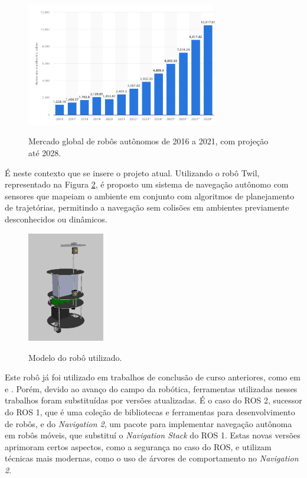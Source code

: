 \documentclass[repeatfields,xlists,xpacks,oneside,yearsonly]{ufrgscca}
\begin{document}

\begin{figure}[htbp]
    {
        \centering
        \caption{Mercado global de robôs autônomos de 2016 a 2021, com projeção até 2028.}
        \label{fig:mercado_robo}
        \includegraphics[width=0.75\textwidth]{mercado_robo}\\
    }
    {}
\end{figure}

É neste contexto que se insere o projeto atual.
Utilizando o robô Twil, representado na Figura \ref{fig:robo_rviz},
é proposto um sistema de navegação autônomo com sensores
que mapeiam o ambiente em conjunto com algoritmos de planejamento
de trajetórias, permitindo a navegação sem colisões em ambientes previamente
desconhecidos ou dinâmicos.

\begin{figure}[h]
    {
        \centering
        \caption{Modelo do robô utilizado.}
        \label{fig:robo_rviz}
        \includegraphics[width=0.3\textwidth]{robo_rviz.png}\\
    }
\end{figure}

Este robô já foi utilizado em trabalhos de conclusão de curso
anteriores, como em \textcite{petry_tcc} e \textcite{rahul_tcc}.
Porém, devido ao avanço do campo da robótica, ferramentas utilizadas
nesses trabalhos foram substituídas por versões atualizadas. É o caso
do ROS 2, sucessor do ROS 1, que é uma coleção de bibliotecas e
ferramentas para desenvolvimento de robôs, e do \textit{Navigation
    2}, um pacote para implementar navegação autônoma em robôs móveis,
que substituí o \textit{Navigation Stack} do ROS 1. Estas novas
versões aprimoram certos aspectos, como a segurança no caso do ROS, e
utilizam técnicas mais modernas, como o uso de árvores de
comportamento no \textit{Navigation 2}.
\end{document}
